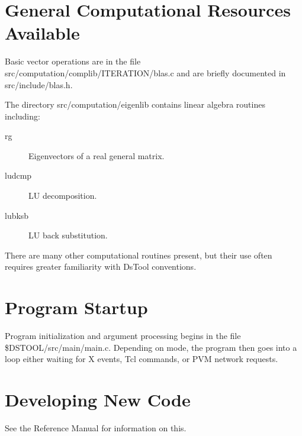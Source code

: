 \section{General Computational Resources Available}

Basic vector operations are in the file 
src/computation/complib/ITERATION/blas.c and are
briefly documented in src/include/blas.h. 

The directory src/computation/eigenlib contains linear algebra 
routines including:

\begin{description}

  \item[rg] Eigenvectors of a real general matrix.

  \item[ludcmp] LU decomposition. 

  \item[lubksb] LU back substitution.

\end{description}

There are many other computational routines present, but 
their use often requires greater familiarity with DsTool conventions.

\section{Program Startup}

Program initialization and argument processing begins in the file
\$DSTOOL/src/main/main.c. Depending on mode, the program then goes into a 
loop either waiting for X events,  Tcl commands, or PVM 
network requests.


\section{Developing New Code}

See the Reference Manual for information on this.


